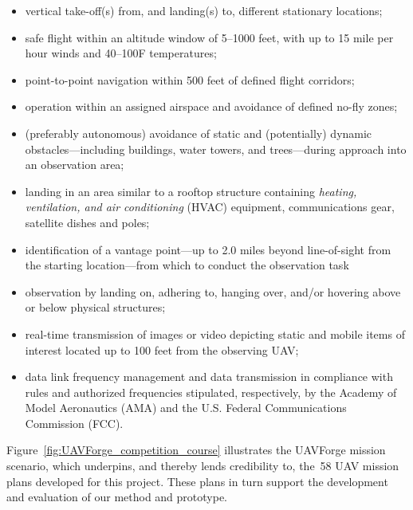 \begin{itemize}

\item vertical take-off(s) from, and landing(s) to, different stationary locations;

\item safe flight within an altitude window of 5--1000 feet, with up to 15 mile per hour winds and 40--100\textdegree F temperatures;

\item point-to-point navigation within 500 feet of defined flight corridors;

\item operation within an assigned airspace and avoidance of defined no-fly zones;

\item (preferably autonomous) avoidance of static and (potentially) dynamic obstacles---including buildings, water towers, and trees---during approach into an observation area;

\item landing in an area similar to a rooftop structure containing \emph{heating, ventilation, and air conditioning} (HVAC) equipment, communications gear, satellite dishes and poles;

\item identification of a vantage point---up to 2.0 miles beyond line-of-sight from the starting location---from which to conduct the observation task

\item observation by landing on, adhering to, hanging over, and/or hovering above or below physical structures;

\item real-time transmission of images or video depicting static and mobile items of interest located up to 100 feet from the observing UAV;

\item data link frequency management and data transmission in compliance with rules and authorized frequencies stipulated, respectively, by the Academy of Model Aeronautics (AMA) and the U.S. Federal Communications Commission (FCC).

\end{itemize}

Figure~\ref{fig:UAVForge_competition_course} illustrates the UAVForge mission scenario, which underpins, and thereby lends credibility to, the~58 UAV mission plans developed for this project. These plans in turn support the development and evaluation of our method and prototype.

